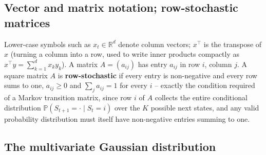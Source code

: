 \documentclass[11pt]{article}
\theoremstyle{definition}
\theoremstyle{remark}
\begin{document}
\subsection{Vector and matrix notation; row-stochastic matrices}

Lower-case symbols such as $x_t\in\mathbb{R}^d$ denote column vectors; $x^\top$ is the transpose of $x$ (turning a column into a row, used to write inner products compactly as $x^\top y=\sum_{k=1}^d x_ky_k$). A matrix $A=(a_{ij})$ has entry $a_{ij}$ in row $i$, column $j$. A square matrix $A$ is \textbf{row-stochastic} if every entry is non-negative and every row sums to one, $a_{ij}\ge0$ and $\sum_{j}a_{ij}=1$ for every $i$ -- exactly the condition required of a Markov transition matrix, since row $i$ of $A$ collects the entire conditional distribution $\mathbb{P}(S_{t+1}=\cdot\mid S_t=i)$ over the $K$ possible next states, and any valid probability distribution must itself have non-negative entries summing to one.

\subsection{The multivariate Gaussian distribution}
\label{sec:mvgauss}
\end{document}
